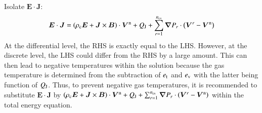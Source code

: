 \documentclass{warpdoc}
\renewcommand{\vec}[1]{\bm{#1}}
\begin{document}
%
Isolate $\vec{E}\cdot\vec{J}$:
%
\begin{equation}
\vec{E} \cdot \vec{J}
=
 \left(\rho_{\rm c} \vec{E} + \vec{J}\times\vec{B} \right)\cdot \vec{V}^{\rm n}
+ Q_{\rm J} 
+  \sum_{r=1}^{n_{\rm cs}} \vec{\nabla} P_r \cdot \left(\vec{V}^r-\vec{V}^{\rm n}\right) 
\end{equation}
%
At the differential level, the RHS is exactly equal to the LHS. However, at the discrete level, the LHS could differ from the RHS by a large amount. This can then lead to negative temperatures within the solution because the gas temperature is determined from the subtraction of $e_{\rm t}$ and $e_{\rm v}$ with the latter being function of $Q_{\rm J}$. Thus, to prevent negative gas temperatures, it is recommended to substitute $\vec{E}\cdot\vec{J}$ by $\left(\rho_{\rm c} \vec{E} + \vec{J}\times\vec{B} \right)\cdot \vec{V}^{\rm n}
+ Q_{\rm J} +  \sum_{r=1}^{n_{\rm cs}} \vec{\nabla} P_r \cdot \left(\vec{V}^r-\vec{V}^{\rm n}\right)$ within the total energy equation.


 

  
  
\end{document}
